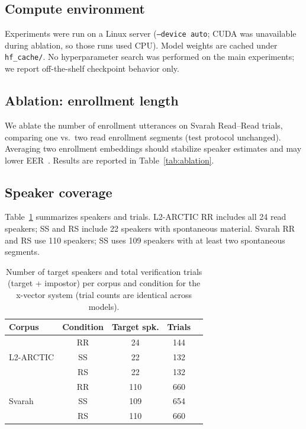\documentclass[cameraready]{Interspeech}
\begin{document}
\subsection{Compute environment}

Experiments were run on a Linux server (\texttt{--device auto}; CUDA was unavailable during ablation, so those runs used CPU). Model weights are cached under \texttt{hf\_cache/}. No hyperparameter search was performed on the main experiments; we report off-the-shelf checkpoint behavior only.

\subsection{Ablation: enrollment length}

We ablate the number of enrollment utterances on Svarah Read--Read trials, comparing one vs.\ two read enrollment segments (test protocol unchanged). Averaging two enrollment embeddings should stabilize speaker estimates and may lower EER~\cite{snyder2018xvector}. Results are reported in Table~\ref{tab:ablation}.

\subsection{Speaker coverage}

Table~\ref{tab:trialcounts} summarizes speakers and trials. L2-ARCTIC RR includes all 24 read speakers; SS and RS include 22 speakers with spontaneous material. Svarah RR and RS use 110 speakers; SS uses 109 speakers with at least two spontaneous segments.

\begin{table}[t]
  \caption{Number of target speakers and total verification trials (target + impostor) per corpus and condition for the x-vector system (trial counts are identical across models).}
  \label{tab:trialcounts}
  \centering
  \begin{tabular}{lcccc}
    \toprule
    Corpus & Condition & Target spk. & Trials \\
    \midrule
    \multirow{3}{*}{L2-ARCTIC} & RR & 24 & 144 \\
     & SS & 22 & 132 \\
     & RS & 22 & 132 \\
    \midrule
    \multirow{3}{*}{Svarah} & RR & 110 & 660 \\
     & SS & 109 & 654 \\
     & RS & 110 & 660 \\
    \bottomrule
  \end{tabular}
\end{table}
\end{document}
